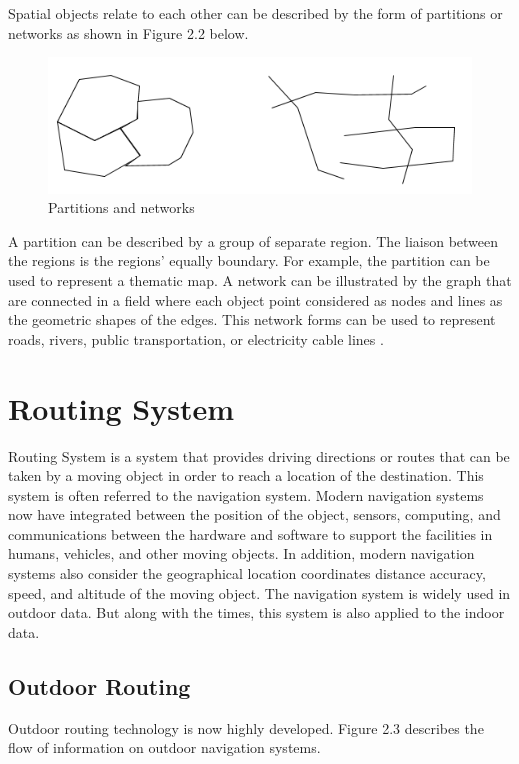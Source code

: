 Spatial objects relate to each other can be described by the form of partitions or networks as shown in Figure 2.2 below. 

\begin{figure}[h!]
	\centering
	\includegraphics[scale=0.7]{figure2.png}
	\caption{Partitions and networks}
	\label{fig:figure2}
\end{figure}

A partition can be described by a group of separate region. The liaison between the regions is the regions’ equally boundary. For example, the partition can be used to represent a thematic map. A network can be illustrated by the graph that are connected in a field where each object point considered as nodes and lines as the geometric shapes of the edges. This network forms can be used to represent roads, rivers, public transportation, or electricity cable lines \cite{guting1994introduction}.


\section{Routing System}
Routing System is a system that provides driving directions or routes that can be taken by a moving object in order to reach a location of the destination. This system is often referred to the navigation system. Modern navigation systems now have integrated between the position of the object, sensors, computing, and communications between the hardware and software to support the facilities in humans, vehicles, and other moving objects. In addition, modern navigation systems also consider the geographical location coordinates distance accuracy, speed, and altitude of the moving object. The navigation system is widely used in outdoor data. But along with the times, this system is also applied to the indoor data.

\subsection{Outdoor Routing}
Outdoor routing technology is now highly developed. Figure 2.3 describes the flow of information on outdoor navigation systems.

